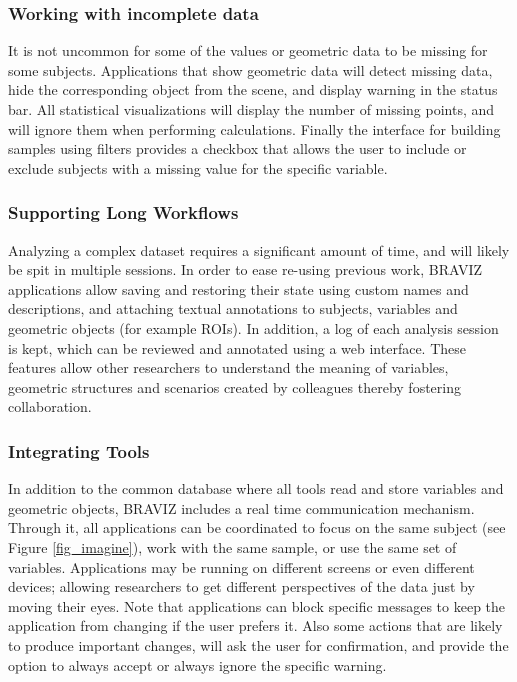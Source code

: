 \documentclass[twocolumn]{svjour3}
\begin{document}
\subsubsection{Working with incomplete data}

It is not uncommon for some of the values or geometric data to be missing for some subjects. Applications that show geometric data will detect missing data, hide the corresponding object from the scene, and display warning in the status bar. All statistical visualizations will display the number of missing points, and will ignore them when performing calculations. Finally the interface for building samples using filters provides a checkbox that allows the user to include or exclude subjects with a missing value for the specific variable.

\subsubsection{Supporting Long Workflows}

Analyzing a complex dataset requires a significant amount of time, and will likely be spit in multiple sessions. In order to ease re-using previous work, BRAVIZ applications allow saving and restoring their state using custom names and descriptions, and attaching textual annotations to subjects, variables and geometric objects (for example ROIs). In addition, a log of each analysis session is kept, which can be reviewed and annotated using a web interface. These features allow other researchers to understand the meaning of variables, geometric structures and scenarios created by colleagues thereby fostering collaboration. 

\subsubsection{Integrating Tools}

In addition to the common database where all tools read and store variables and geometric objects, BRAVIZ includes a real time communication mechanism. Through it, all applications can be coordinated to focus on the same subject (see Figure \ref{fig_imagine}), work with the same sample, or use the same set of variables. Applications may be running on different screens or even different devices; allowing researchers to get different perspectives of the data just by moving their eyes. Note that applications can block specific messages to keep the application from changing if the user prefers it. Also some actions that are likely to produce important changes, will ask the user for confirmation, and provide the option to always accept or always ignore the specific warning.
\end{document}
